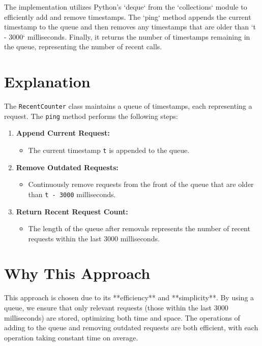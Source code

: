 The implementation utilizes Python's `deque` from the `collections` module to efficiently add and remove timestamps. The `ping` method appends the current timestamp to the queue and then removes any timestamps that are older than `t - 3000` milliseconds. Finally, it returns the number of timestamps remaining in the queue, representing the number of recent calls.

\section*{Explanation}
The \texttt{RecentCounter} class maintains a queue of timestamps, each representing a request. The \texttt{ping} method performs the following steps:

\begin{enumerate}
    \item \textbf{Append Current Request:}
    \begin{itemize}
        \item The current timestamp \texttt{t} is appended to the queue.
    \end{itemize}
    
    \item \textbf{Remove Outdated Requests:}
    \begin{itemize}
        \item Continuously remove requests from the front of the queue that are older than \texttt{t - 3000} milliseconds.
    \end{itemize}
    
    \item \textbf{Return Recent Request Count:}
    \begin{itemize}
        \item The length of the queue after removals represents the number of recent requests within the last 3000 milliseconds.
    \end{itemize}
\end{enumerate}

\section*{Why This Approach}
This approach is chosen due to its **efficiency** and **simplicity**. By using a queue, we ensure that only relevant requests (those within the last 3000 milliseconds) are stored, optimizing both time and space. The operations of adding to the queue and removing outdated requests are both efficient, with each operation taking constant time on average.

